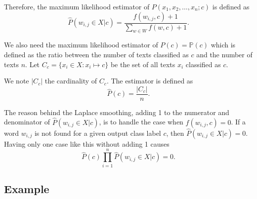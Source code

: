 \documentclass{article}
\begin{document}
Therefore, the maximum likelihood estimator of $P(x_1,x_2,\ldots,x_n ; c)$ is defined as
\begin{equation}
	\widehat{P}(w_{i,j} \in X | c) = \frac{f(w_{i,j}, c) + 1}{\sum\limits_{w \in W} f(w, c) + 1}.
\end{equation}

We also need the maximum likelihood estimator of $P(c) = \mathbb{P}(c)$ which is defined as the ratio between the number of texts classified as $c$ and the number of texts $n$. Let $C_c = \{x_i \in X : x_i \mapsto c\}$ be the set of all texts $x_i$ classified as $c$. 

We note $|C_c|$ the cardinality of $C_c$. The estimator is defined as
\begin{equation}
	\widehat{P}(c) = \frac{|C_c|}{n}.
\end{equation}

The reason behind the Laplace smoothing, adding 1 to the numerator and denominator of $\widehat{P}(w_{i,j} \in X | c)$, is to handle the case when $f(w_{i,j}, c) = 0$. If a word $w_{i,j}$ is not found for a given output class label $c$, then $\widehat{P}(w_{i,j} \in X | c) = 0$. Having only one case like this without adding 1 causes 
\begin{equation}
	\widehat{P}(c) \prod\limits_{i=1}^n \widehat{P}(w_{i,j} \in X | c) = 0.
\end{equation}


\subsection{Example}
\end{document}
